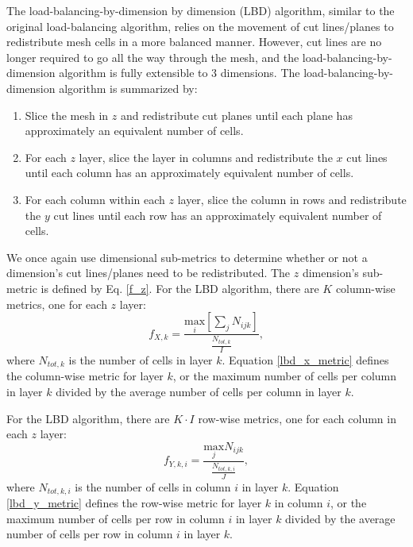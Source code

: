 \documentclass[times,final]{elsarticle}
\begin{document}
The load-balancing-by-dimension by dimension (LBD) algorithm, similar to the original load-balancing algorithm, relies on the movement of cut lines/planes to redistribute mesh cells in a more balanced manner.
However, cut lines are no longer required to go all the way through the mesh, and the load-balancing-by-dimension algorithm is fully extensible to 3 dimensions.
The load-balancing-by-dimension algorithm is summarized by:
\begin{enumerate}
  \item Slice the mesh in $z$ and redistribute cut planes until each plane has approximately an equivalent number of cells.
  \item For each $z$ layer, slice the layer in columns and redistribute the $x$ cut lines until each column has an approximately equivalent number of cells.
  \item For each column within each $z$ layer, slice the column in rows and redistribute the $y$ cut lines until each row has an approximately equivalent number of cells.
\end{enumerate}

We once again use dimensional sub-metrics to determine whether or not a dimension's cut lines/planes need to be redistributed. The $z$ dimension's sub-metric is defined by Eq. \ref{f_z}. For the LBD algorithm, there are $K$ column-wise metrics, one for each $z$ layer:
\begin{equation}
f_{X,k} = \frac{ \underset{i}{\text{max}}[ \sum_{j} N_{ijk}]  }  {\frac{N_{tot,k}}{I}},
\label{lbd_x_metric}
\end{equation}
where $N_{tot,k}$ is the number of cells in layer $k$.
Equation \ref{lbd_x_metric} defines the column-wise metric for layer $k$, or the maximum number of cells per column in layer $k$ divided by the average number of cells per column in layer $k$.

For the LBD algorithm, there are $K\cdot I$ row-wise metrics, one for each column in each $z$ layer:
\begin{equation}
f_{Y,k,i} = \frac{\underset{j}{\text{max}} N_{ijk} } {\frac{N_{tot,k,i}}{J}},
\label{lbd_y_metric}
\end{equation}
where $N_{tot,k,i}$ is the number of cells in column $i$ in layer $k$.
Equation \ref{lbd_y_metric} defines the row-wise metric for layer $k$ in column $i$, or the maximum number of cells per row in column $i$ in layer $k$ divided by the average number of cells per row in column $i$ in layer $k$.
\end{document}
